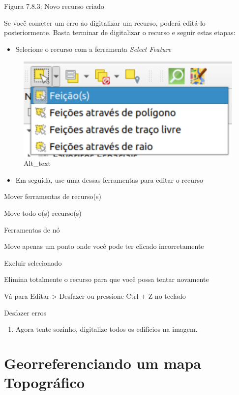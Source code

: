 \documentclass[
  portuguese,
]{krantz}
\providecommand{\tightlist}{%
  \setlength{\itemsep}{0pt}\setlength{\parskip}{0pt}}
\begin{document}
Figura 7.8.3: Novo recurso criado

Se você cometer um erro ao digitalizar um recurso, poderá editá-lo posteriormente. Basta terminar de digitalizar o recurso e seguir estas etapas:

\begin{itemize}
\tightlist
\item
  Selecione o recurso com a ferramenta \emph{Select Feature}
\end{itemize}

\begin{figure}
\centering
\includegraphics{media/modulo7/select-feature.png}
\caption{Alt\_text}
\end{figure}

\begin{itemize}
\tightlist
\item
  Em seguida, use uma dessas ferramentas para editar o recurso
\end{itemize}

Mover ferramentas de recurso(s)

Move todo o(s) recurso(s)

Ferramentas de nó

Move apenas um ponto onde você pode ter clicado incorretamente

Excluir selecionado

Elimina totalmente o recurso para que você possa tentar novamente

Vá para Editar \textgreater{} Desfazer ou pressione Ctrl + Z no teclado

Desfazer erros

\begin{enumerate}
\def\labelenumi{\arabic{enumi}.}
\setcounter{enumi}{16}
\tightlist
\item
  Agora tente sozinho, digitalize todos os edifícios na imagem.
\end{enumerate}

\hypertarget{georreferenciando-um-mapa-topogruxe1fico}{%
\section{Georreferenciando um mapa Topográfico}\label{georreferenciando-um-mapa-topogruxe1fico}}
\end{document}

